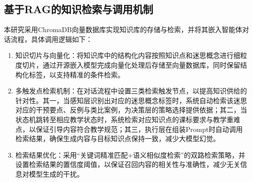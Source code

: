 \subsection{基于RAG的知识检索与调用机制}
本研究采用ChromaDB向量数据库实现知识库的存储与检索，并将其嵌入智能体对话流程，具体调用逻辑如下：
\begin{enumerate}
\item 知识切片与向量化：将知识库中的结构化内容按照知识点和迷思概念进行细粒度切片，通过开源嵌入模型完成向量化处理后存储至向量数据库，同时保留结构化标签，以支持精准的条件检索。
\item 多触发点检索机制：在对话流程中设置三类检索触发节点，以提高知识供给的针对性。其一，当感知层识别出对应的迷思概念标签时，系统自动检索该迷思对应的干预要点、反例与类比案例，为决策层的策略选择提供依据；其二，当状态机跳转至相应教学状态时，系统检索对应知识点的课标要求与教学重难点，以保证引导内容符合教学规范；其三，执行层在组装Prompt时自动调用检索结果，确保生成内容与目标知识点保持一致，减少大模型幻觉。
\item 检索结果优化：采用“关键词精准匹配+语义相似度检索”的双路检索策略，并设置检索结果的置信度阈值，以保证召回内容的相关性与准确性，减少无关信息对模型生成的干扰。
\end{enumerate}

